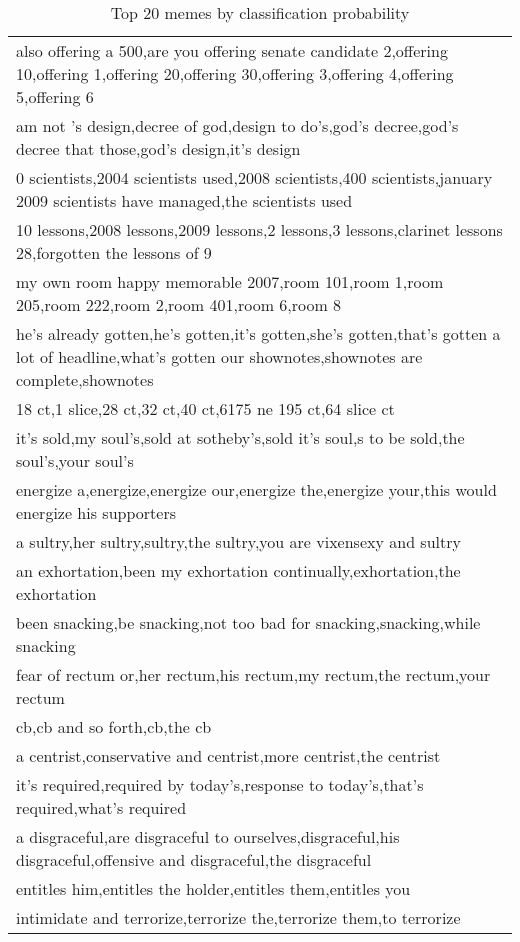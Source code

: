 \documentclass{sig-alternate}
\begin{document}
\begin{table*}[h!b!p!]
\begin{center}
\begin{tabular}{|p{15cm}|}
\hline
also offering a 500,are you offering senate candidate 2,offering 10,offering 1,offering 20,offering 30,offering 3,offering 4,offering 5,offering 6\\
am not 's design,decree of god,design to do's,god's decree,god's decree that those,god's design,it's design\\
0 scientists,2004 scientists used,2008 scientists,400 scientists,january 2009 scientists have managed,the scientists used\\
10 lessons,2008 lessons,2009 lessons,2 lessons,3 lessons,clarinet lessons 28,forgotten the lessons of 9\\
my own room happy memorable 2007,room 101,room 1,room 205,room 222,room 2,room 401,room 6,room 8\\
he's already gotten,he's gotten,it's gotten,she's gotten,that's gotten a lot of headline,what's gotten our shownotes,shownotes are complete,shownotes\\
18 ct,1 slice,28 ct,32 ct,40 ct,6175 ne 195 ct,64 slice ct\\
it's sold,my soul's,sold at sotheby's,sold it's soul,s to be sold,the soul's,your soul's\\
energize a,energize,energize our,energize the,energize your,this would energize his supporters\\
a sultry,her sultry,sultry,the sultry,you are vixensexy and sultry\\
an exhortation,been my exhortation continually,exhortation,the exhortation\\
been snacking,be snacking,not too bad for snacking,snacking,while snacking\\
fear of rectum or,her rectum,his rectum,my rectum,the rectum,your rectum\\
cb,cb and so forth,cb,the cb\\
a centrist,conservative and centrist,more centrist,the centrist\\
it's required,required by today's,response to today's,that's required,what's required\\
a disgraceful,are disgraceful to ourselves,disgraceful,his disgraceful,offensive and disgraceful,the disgraceful\\
entitles him,entitles the holder,entitles them,entitles you\\
intimidate and terrorize,terrorize the,terrorize them,to terrorize\\
\hline
\end{tabular}
\caption{Top 20 memes by classification probability}
\label{table:svm_result}
\end{center}
\end{table*}
\end{document}
